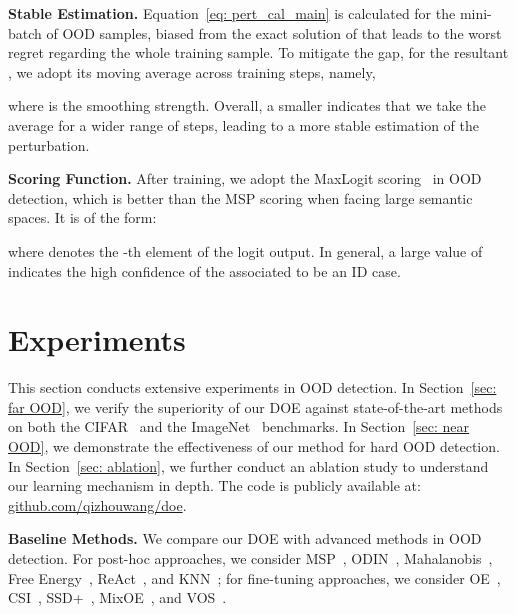 \documentclass{article} \usepackage{iclr2022_conference,times}
\def\Eqref#1{Equation~\ref{#1}}
\begin{document}
\textbf{Stable Estimation.} \Eqref{eq: pert_cal_main} is calculated for the mini-batch of OOD samples, biased from the exact solution of  that leads to the worst regret regarding the whole training sample. To mitigate the gap, for the resultant , we adopt its moving average across training steps, namely,

where  is the smoothing strength. Overall, a smaller  indicates that we take the average for a wider range of steps, leading to a more stable estimation of the perturbation. 

\textbf{Scoring Function.} After training, we adopt the MaxLogit scoring~\citep{HendrycksBMZKMS22} in OOD detection, which is better than the MSP scoring when facing large semantic spaces. It is of the form:

where  denotes the -th element of the logit output. In general, a large value of  indicates the high confidence of the associated  to be an ID case. 


















\section{Experiments} \label{sec: experiment}

This section conducts extensive experiments in OOD detection. In Section~\ref{sec: far OOD}, we verify the superiority of our DOE against state-of-the-art methods on both the CIFAR~\citep{krizhevsky2009learning} and the ImageNet~\citep{deng2009imagenet} benchmarks. In Section~\ref{sec: near OOD}, we demonstrate the effectiveness of our method for hard OOD detection. In Section~\ref{sec: ablation}, we further conduct an ablation study to understand our learning mechanism in depth. The code is publicly available at: \href{https://github.com/QizhouWang/DOE}{{github.com/qizhouwang/doe}}.



\textbf{Baseline Methods.} We compare our  DOE with advanced methods in OOD detection. For post-hoc approaches, we consider MSP~\citep{hendrycks2016baseline}, ODIN~\citep{LiangLS18}, Mahalanobis~\citep{lee2018simple}, Free Energy~\citep{liu2020energy}, ReAct~\citep{sun2021react},  and KNN~\citep{SunM0L22}; for fine-tuning approaches, we consider OE~\citep{HendrycksMD19}, CSI~\citep{Tack20CSI}, SSD+~\citep{SehwagCM21}, MixOE~\citep{zhang2021mixture}, and VOS~\citep{du2022vos}.
\end{document}
